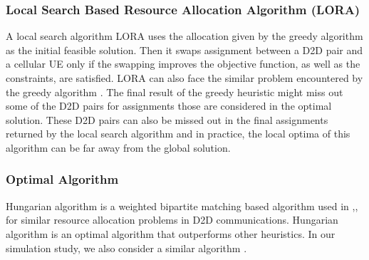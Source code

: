 \documentclass[times]{dacauth}
\begin{document}

\subsubsection{Local Search Based Resource Allocation Algorithm (LORA)} 
\noindent
A local search algorithm LORA \cite {lora} uses the allocation given by the greedy algorithm \cite{zulhasnine} as the initial feasible solution. Then it swaps assignment between a D2D pair and a cellular UE only if the swapping improves the objective function, as well as the constraints,  are satisfied. LORA can also face the similar problem encountered by the greedy algorithm \cite{zulhasnine}. The final result of the greedy heuristic might miss out some of the D2D pairs for assignments those are considered in the optimal solution. These D2D pairs can also be missed out in the final assignments returned by the local search algorithm and in practice, the local optima of this algorithm can be far away from the global solution.


\subsubsection{Optimal Algorithm}

\noindent
Hungarian algorithm \cite{hungarian} is a weighted bipartite matching based algorithm used in \cite {zhang},\cite{feng},\cite{ccnc} for similar resource allocation problems in D2D communications. Hungarian algorithm is an optimal algorithm that outperforms other heuristics. In our simulation study, we also consider a similar algorithm \cite{hungarian}.
\end{document}
